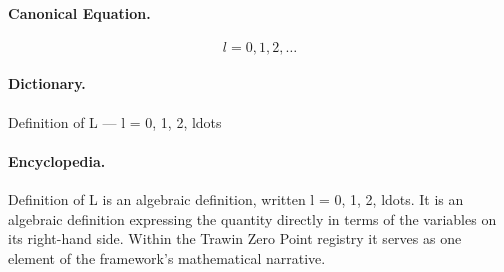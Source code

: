\paragraph{Canonical Equation.}
\[
l = 0, 1, 2, \ldots
\]

\paragraph{Dictionary.}
Definition of L — l = 0, 1, 2, ldots

\paragraph{Encyclopedia.}
Definition of L is an algebraic definition, written l = 0, 1, 2, ldots. It is an algebraic definition expressing the quantity directly in terms of the variables on its right-hand side. Within the Trawin Zero Point registry it serves as one element of the framework's mathematical narrative.
